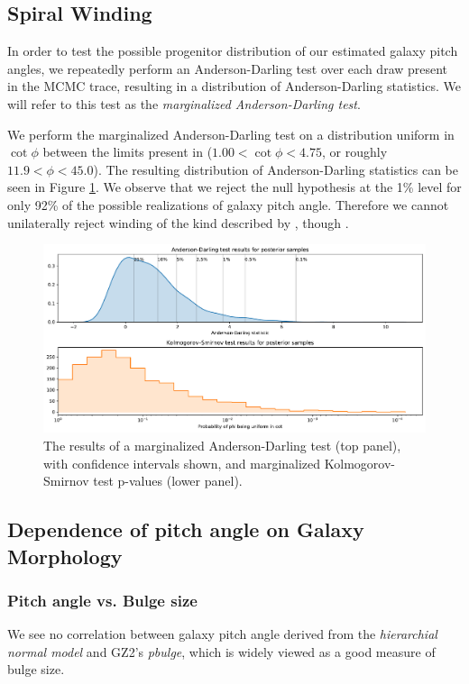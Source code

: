 
\subsection{Spiral Winding}

In order to test the possible progenitor distribution of our estimated galaxy pitch angles, we repeatedly perform an Anderson-Darling test over each draw present in the MCMC trace, resulting in a distribution of Anderson-Darling statistics. We will refer to this test as the \textit{marginalized Anderson-Darling test}.

We perform the marginalized Anderson-Darling test on a distribution uniform in $\cot\phi$ between the limits present in \citet{2019arXiv190910291P} ($1.00 < \cot\phi < 4.75$, or roughly $11.9 < \phi < 45.0$). The resulting distribution of Anderson-Darling statistics can be seen in Figure \ref{fig:ad-cot-test}. We observe that we reject the null hypothesis at the 1\% level for only 92\% of the possible realizations of galaxy pitch angle. Therefore we cannot unilaterally reject winding of the kind described by \citet{2019arXiv190910291P}, though .

\begin{figure}
  \includegraphics[width=17.7cm]{plots/cot_uniform_marginalized_tests.pdf}
  \caption{The results of a marginalized Anderson-Darling test (top panel), with confidence intervals shown, and marginalized Kolmogorov-Smirnov test p-values (lower panel).}
  \label{fig:ad-cot-test}
\end{figure}

\subsection{Dependence of pitch angle on Galaxy Morphology}
\label{section:morphology_comparision}
\subsubsection{Pitch angle vs. Bulge size}
We see no correlation between galaxy pitch angle derived from the \textit{hierarchial normal model} and GZ2's \textit{pbulge}, which is widely viewed as a good measure of bulge size.



